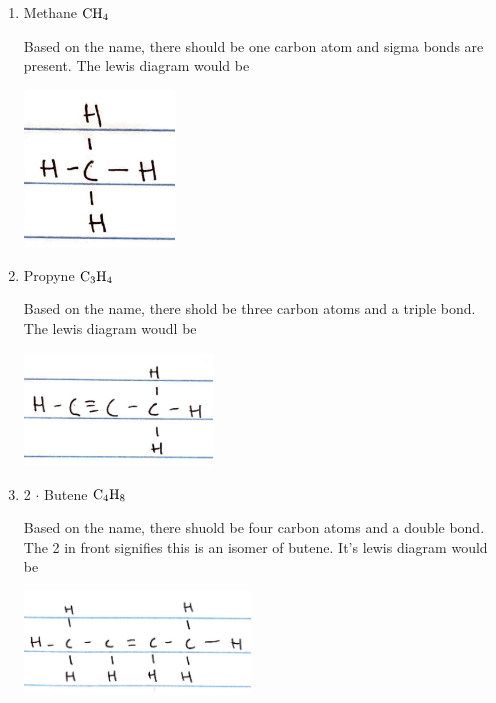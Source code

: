 \documentclass{scrartcl}
\begin{document}
\begin{enumerate}
\item Methane \(\ce{CH4}\)

Based on the name, there should be one carbon atom and sigma bonds are
present. The lewis diagram would be

\begin{center}
\includegraphics[width=4cm]{./images/7.JPG}
\end{center}

\item Propyne \(\ce{C3H4}\)

Based on the name, there shold be three carbon atoms and a triple bond. The
lewis diagram woudl be

\begin{center}
\includegraphics[width=5cm]{./images/8.JPG}
\end{center}

\item 2 \(\cdot\) Butene \(\ce{C4H8}\)

Based on the name, there shuold be four carbon atoms and a double bond. The 2
in front signifies this is an isomer of butene. It's lewis diagram would be

\begin{center}
\includegraphics[width=6cm]{./images/9.JPG}
\end{center}
\end{enumerate}
\end{document}
